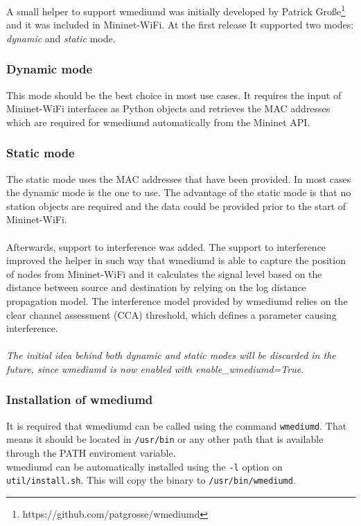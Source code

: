 A small helper to support wmediumd was initially developed by Patrick Große\footnote{https://github.com/patgrosse/wmediumd} and it was included in Mininet-WiFi. At the first release It supported two modes: \textit{dynamic} and \textit{static} mode.

\subsubsection{Dynamic mode}
This mode should be the best choice in most use cases. It requires the input of Mininet-WiFi interfaces as Python objects and retrieves the MAC addresses which are required for wmediumd automatically from the Mininet API.

\subsubsection{Static mode}
The static mode uses the MAC addresses that have been provided. In most cases the dynamic mode is the one to use. The advantage of the static mode is that no station objects are required and the data could be provided prior to the start of Mininet-WiFi.
\\\\
\noindent Afterwards, support to interference was added. The support to interference improved the helper in such way that wmediumd is able to capture the position of nodes from Mininet-WiFi and it calculates the signal level based on the distance between source and destination by relying on the log distance propagation model. The interference model provided by wmediumd relies on the clear channel assessment (CCA) threshold, which defines a parameter causing interference.
\\\\
\textit{The initial idea behind both dynamic and static modes will be discarded in the future, since wmediumd is now enabled with enable\_wmediumd=True.}

\subsubsection{Installation of wmediumd}
It is required that wmediumd can be called using the command \texttt{wmediumd}. That means it should be located in \texttt{/usr/bin} or any other path that is available through the PATH enviroment variable.\\
wmediumd can be automatically installed using the \texttt{-l} option on \texttt{util/install.sh}. This will copy the binary to \texttt{/usr/bin/wmediumd}.


